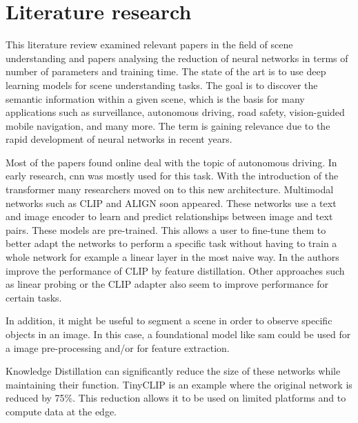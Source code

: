 \chapter{Literature research}
This literature review examined relevant papers in the field of scene understanding and papers analysing the reduction of neural networks in terms of number of parameters and training time.
The state of the art is to use deep learning models for scene understanding tasks.
The goal is to discover the semantic information within a given scene, which is the basis for many applications such as surveillance, autonomous driving, road safety, vision-guided mobile navigation, and many more.
The term is gaining relevance due to the rapid development of neural networks in recent years.

Most of the papers found online deal with the topic of autonomous driving\cite{sceneunderstandingautdriving1}.
In early research, \acrfull{cnn}\cite{SegNet} was mostly used for this task.
With the introduction of the transformer \cite{attentionisallyouneed} many researchers moved on to this new architecture.
Multimodal networks such as CLIP\cite{clip} and ALIGN\cite{ALIGN} soon appeared.
These networks use a text and image encoder to learn and predict relationships between image and text pairs.
These models are pre-trained.
This allows a user to fine-tune them to better adapt the networks to perform a specific task without having to train a whole network for example a linear layer in the most naive way.
In \cite{finetuneclip} the authors improve the performance of CLIP by feature distillation.
Other approaches such as linear probing\cite{linearprobeclip} or the CLIP adapter\cite{clipadapter} also seem to improve performance for certain tasks.

In addition, it might be useful to segment a scene in order to observe specific objects in an image.
In this case, a foundational model like \Acrfull{sam}\cite{sam} could be used for a image pre-processing and/or for feature extraction.

Knowledge Distillation can significantly reduce the size of these networks while maintaining their function.
TinyCLIP\cite{tinyclip} is an example where the original network is reduced by 75\%.
This reduction allows it to be used on limited platforms and to compute data at the edge.

